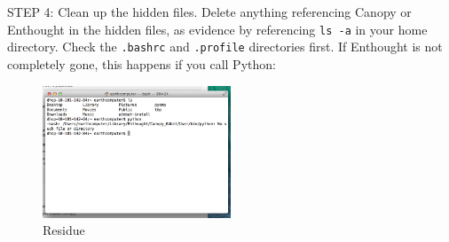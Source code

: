 \documentclass[letterpaper,10pt]{article}
\begin{document}
STEP 4: Clean up the hidden files. Delete anything referencing Canopy or Enthought in the hidden files, as evidence by referencing \verb"ls -a" in your home directory. Check the \verb".bashrc" and \verb".profile" directories first. If Enthought is not completely gone, this happens if you call Python:

\begin{figure}[h!]
  \centering
  \includegraphics[width=0.5\textwidth]{images/residue}
  \caption{Residue}
  \label{fig:residue}
\end{figure}













\end{document}
